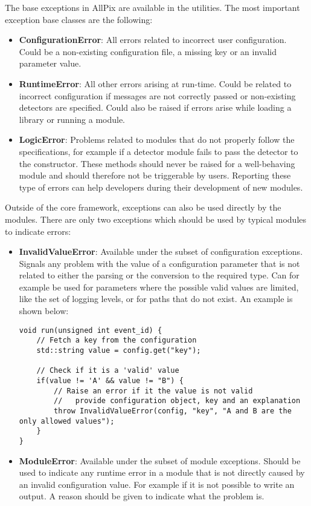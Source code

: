 The base exceptions in AllPix are available in the utilities. The most important exception base classes are the following:
\begin{itemize}
\item \textbf{ConfigurationError}: All errors related to incorrect user configuration. Could be a non-existing configuration file, a missing key or an invalid parameter value.
\item \textbf{RuntimeError}: All other errors arising at run-time. Could be related to incorrect configuration if messages are not correctly passed or non-existing detectors are specified. Could also be raised if errors arise while loading a library or running a module.
\item \textbf{LogicError}: Problems related to modules that do not properly follow the specifications, for example if a detector module fails to pass the detector to the constructor. These methods should never be raised for a well-behaving module and should therefore not be triggerable by users. Reporting these type of errors can help developers during their development of new modules.
\end{itemize}

Outside of the core framework, exceptions can also be used directly by the modules. There are only two exceptions which should be used by typical modules to indicate errors:
\begin{itemize}
\item \textbf{InvalidValueError}: Available under the subset of configuration exceptions. Signals any problem with the value of a configuration parameter that is not related to either the parsing or the conversion to the required type. Can for example be used for parameters where the possible valid values are limited, like the set of logging levels, or for paths that do not exist. An example is shown below:
\begin{verbatim}
void run(unsigned int event_id) {
    // Fetch a key from the configuration
    std::string value = config.get("key");
    
    // Check if it is a 'valid' value
    if(value != 'A' && value != "B") {
        // Raise an error if it the value is not valid
        //   provide configuration object, key and an explanation
        throw InvalidValueError(config, "key", "A and B are the only allowed values");
    }
}
\end{verbatim}
\item \textbf{ModuleError}: Available under the subset of module exceptions. Should be used to indicate any runtime error in a module that is not directly caused by an invalid configuration value. For example if it is not possible to write an output. A reason should be given to indicate what the problem is. 
\end{itemize}

